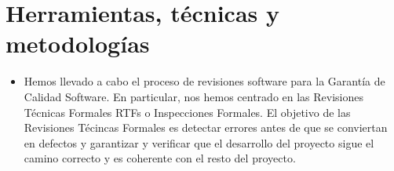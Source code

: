 \documentclass[spanish,a4paper,11pt, twoside]{report}	%
\begin{document}
\newpage
\mbox{}
\thispagestyle{empty}						%
\newpage

\chapter{ Herramientas, técnicas y metodologías}
	\begin{itemize}
	\item Hemos llevado a cabo el proceso de revisiones software para la Garantía de Calidad Software. En particular, nos hemos centrado en las Revisiones Técnicas Formales RTFs o Inspecciones Formales. El objetivo de las Revisiones Técincas Formales es detectar errores antes de que se conviertan en defectos y garantizar y verificar que el desarrollo del proyecto sigue el camino correcto y es coherente con el resto del proyecto.
	\end{itemize}

\newpage
\mbox{}
\thispagestyle{empty}						%
\newpage



 
\end{document}
